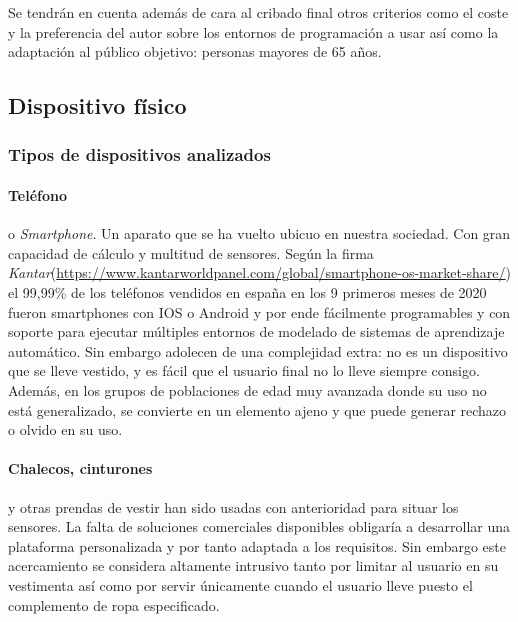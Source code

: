 Se tendrán en cuenta además de cara al cribado final otros criterios como el coste y la preferencia del autor sobre los entornos de programación a usar así como la adaptación al público objetivo: personas mayores de 65 años. 

\subsection{Dispositivo físico}\label{sub:req:hardware}

\subsubsection{Tipos de dispositivos analizados}

\paragraph{Teléfono} o \textit{Smartphone}. Un aparato que se ha vuelto ubicuo en nuestra sociedad. Con gran capacidad de cálculo y multitud de sensores. Según la firma \textit{Kantar}(\url{https://www.kantarworldpanel.com/global/smartphone-os-market-share/}) el 99,99\% de los teléfonos vendidos en españa en los 9 primeros meses de 2020 fueron smartphones con IOS o Android y por ende fácilmente programables y con soporte para ejecutar múltiples entornos de modelado de sistemas de aprendizaje automático. Sin embargo adolecen de una complejidad extra: no es un dispositivo que se lleve vestido, y es fácil que el usuario final no lo lleve siempre consigo. Además, en los grupos de poblaciones de edad muy avanzada donde su uso no está generalizado, se convierte en un elemento ajeno y que puede generar rechazo o olvido en su uso.

\paragraph{Chalecos, cinturones} y otras prendas de vestir han sido usadas con anterioridad  para situar los sensores. La falta de soluciones comerciales disponibles obligaría a desarrollar una plataforma personalizada y por tanto adaptada a los requisitos. Sin embargo este acercamiento se considera altamente intrusivo tanto por limitar al usuario en su vestimenta así como por servir únicamente cuando el usuario lleve puesto el complemento de ropa especificado.

